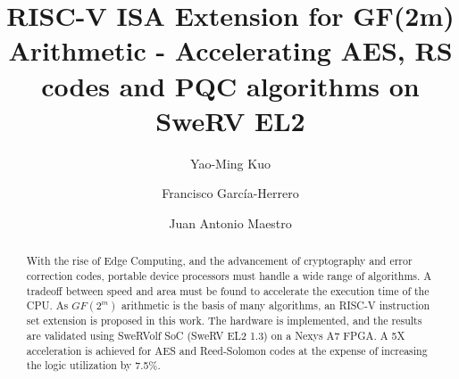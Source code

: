 \documentclass[sigconf]{acmart}
\begin{document}
\title{RISC-V ISA Extension for GF(2m) Arithmetic - Accelerating AES, RS codes and PQC algorithms on SweRV EL2}

\author{Yao-Ming Kuo}
\author{Francisco García-Herrero}
\author{Juan Antonio Maestro}


\begin{abstract}
  With the rise of Edge Computing, and the advancement of cryptography and error correction codes, 
  portable device processors must handle a wide range of algorithms. A tradeoff between speed and area must be found to 
  accelerate the execution time of the CPU. As $GF(2^m)$ arithmetic is the basis of many algorithms, 
  an RISC-V instruction set extension is proposed in this work. The hardware is implemented, and the 
  results are validated using SweRVolf SoC (SweRV EL2 1.3) on a Nexys A7 FPGA. A 5X acceleration 
  is achieved for AES and Reed-Solomon codes at the expense of increasing the logic utilization by 7.5\%.
\end{abstract}

\end{document}
